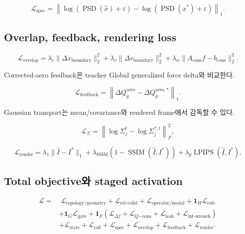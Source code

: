 \documentclass[11pt,a4paper]{article}
\newcommand{\eps}{\varepsilon}
\begin{document}
\begin{equation}
  \mathcal L_{\mathrm{spec}}
  =
  \left\|
  \log(\operatorname{PSD}(\widehat x)+\eps)
  -
  \log(\operatorname{PSD}(x^*)+\eps)
  \right\|_1.
\end{equation}

\subsection{Overlap, feedback, rendering loss}

\begin{equation}
  \mathcal L_{\mathrm{overlap}}
  =
  \lambda_c\|\Delta x_{\mathrm{boundary}}\|_2^2
  +\lambda_v\|\Delta v_{\mathrm{boundary}}\|_2^2
  +\lambda_w\|A_{\mathrm{cons}}f-b_{\mathrm{cons}}\|_2^2.
\end{equation}

Corrected-aero feedback은 teacher Global generalized force delta와 비교한다.

\begin{equation}
  \mathcal L_{\mathrm{feedback}}
  =
  \left\|
  \Delta Q_g^{\mathrm{aero}}
  -
  \Delta Q_g^{\mathrm{aero},*}
  \right\|_1.
\end{equation}

Gaussian transport는 mean/covariance와 rendered frame에서 감독할 수 있다.

\begin{equation}
  \mathcal L_{\Sigma}
  =
  \left\|
  \log\Sigma_j^t-\log\Sigma_j^{*,t}
  \right\|_F^2,
\end{equation}

\begin{equation}
  \mathcal L_{\mathrm{render}}
  =
  \lambda_1\|\widehat I-I^*\|_1
  +\lambda_{\mathrm{SSIM}}(1-\operatorname{SSIM}(\widehat I,I^*))
  +\lambda_p\operatorname{LPIPS}(\widehat I,I^*).
\end{equation}

\subsection{Total objective와 staged activation}

\begin{equation}
\begin{aligned}
  \mathcal L
  =&\;
  \mathcal L_{\mathrm{topology/geometry}}
  +\mathcal L_{\mathrm{rel\mbox{-}valid}}
  +\mathcal L_{\mathrm{operator/modal}}
  +\mathbf 1_{H}\mathcal L_{\mathrm{cub}}\\
  &+\mathbf 1_{G}\mathcal L_{\mathrm{gate}}
  +\mathbf 1_{F}
  (\mathcal L_{\Delta f}+\mathcal L_{Q\mathrm{-cons}}
  +\mathcal L_{\mathrm{leak}}+\mathcal L_{\mathrm{int\mbox{-}wrench}})\\
  &+\mathcal L_{\mathrm{state}}
  +\mathcal L_{\mathrm{roll}}
  +\mathcal L_{\mathrm{spec}}
  +\mathcal L_{\mathrm{overlap}}
  +\mathcal L_{\mathrm{feedback}}
  +\mathcal L_{\mathrm{render}}.
\end{aligned}
\end{equation}
\end{document}
